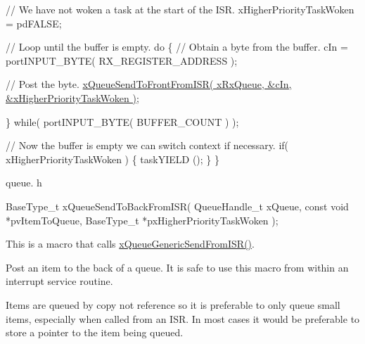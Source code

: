 \begin{DoxyPre}   // We have not woken a task at the start of the ISR.
   xHigherPriorityTaskWoken = pdFALSE;\end{DoxyPre}



\begin{DoxyPre}   // Loop until the buffer is empty.
   do
   \{
    // Obtain a byte from the buffer.
    cIn = portINPUT\_BYTE( RX\_REGISTER\_ADDRESS );\end{DoxyPre}



\begin{DoxyPre}    // Post the byte.
    \hyperlink{queue_8h_af03b83396462affe9e28302660e7b9c6}{xQueueSendToFrontFromISR( xRxQueue, &cIn, &xHigherPriorityTaskWoken )};\end{DoxyPre}



\begin{DoxyPre}   \} while( portINPUT\_BYTE( BUFFER\_COUNT ) );\end{DoxyPre}



\begin{DoxyPre}   // Now the buffer is empty we can switch context if necessary.
   if( xHigherPriorityTaskWoken )
   \{
    taskYIELD ();
   \}
\}
\end{DoxyPre}


queue. h 
\begin{DoxyPre}
BaseType\_t xQueueSendToBackFromISR(
                                     QueueHandle\_t xQueue,
                                     const void *pvItemToQueue,
                                     BaseType\_t *pxHigherPriorityTaskWoken
                                  );
\end{DoxyPre}


This is a macro that calls \hyperlink{queue_8h_a263711eb0124112e828a18fd4b8ab29d}{x\+Queue\+Generic\+Send\+From\+I\+S\+R()}.

Post an item to the back of a queue. It is safe to use this macro from within an interrupt service routine.

Items are queued by copy not reference so it is preferable to only queue small items, especially when called from an I\+SR. In most cases it would be preferable to store a pointer to the item being queued.


